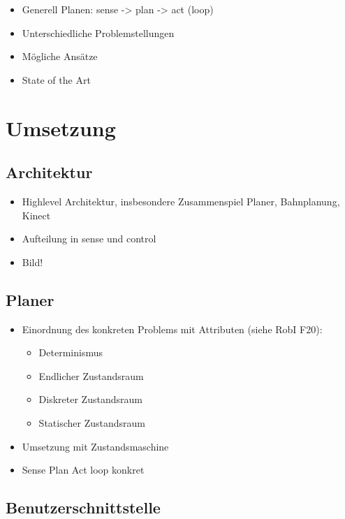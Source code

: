 \begin{itemize}
\item Generell Planen: sense -> plan -> act (loop)
\item Unterschiedliche Problemstellungen
\item Mögliche Ansätze
\item State of the Art
\end{itemize}



\section{Umsetzung}
\label{umsetzung_integration_sec}

\subsection{Architektur}
\label{integration_architektur_sec}

\begin{itemize}
\item Highlevel Architektur, insbesondere Zusammenspiel Planer, Bahnplanung, Kinect
\item Aufteilung in sense und control
\item Bild!
\end{itemize}

\subsection{Planer}
\label{planer_integration_sec}

\begin{itemize}
\item Einordnung des konkreten Problems mit Attributen (siehe RobI F20):
\begin{itemize}
\item Determinismus
\item Endlicher Zustandsraum
\item Diskreter Zustandsraum
\item Statischer Zustandsraum
\end{itemize}
\item Umsetzung mit Zustandsmaschine
\item Sense Plan Act loop konkret
\end{itemize}

\subsection{Benutzerschnittstelle}
\label{benutzerschnittstelle_integration_cha}

